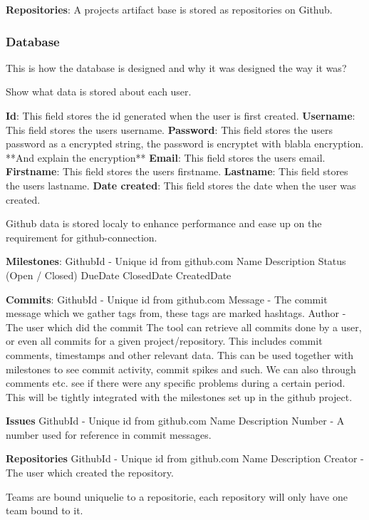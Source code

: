 \textbf{Repositories}:
A projects artifact base is stored as repositories on Github.

\subsubsection{Database}

This is how the database is designed and why it was designed the way it was?

Show what data is stored about each user.

\textbf{Id}: This field stores the id generated when the user is first created.
\textbf{Username}: This field stores the users username.
\textbf{Password}: This field stores the users password as a encrypted string, the password is encryptet with blabla encryption. **And explain the encryption**
\textbf{Email}: This field stores the users email.
\textbf{Firstname}: This field stores the users firstname.
\textbf{Lastname}: This field stores the users lastname.
\textbf{Date created}: This field stores the date when the user was created.

Github data is stored localy to enhance performance and ease up on the requirement for github-connection. 

\textbf{Milestones}:
GithubId - Unique id from github.com
Name
Description
Status (Open / Closed)
DueDate
ClosedDate
CreatedDate

\textbf{Commits}:
GithubId - Unique id from github.com
Message - The commit message which we gather tags from, these tags are marked hashtags.
Author - The user which did the commit
The tool can retrieve all commits done by a user, or even all commits for a given project/repository. This includes commit comments, timestamps and other relevant data. This can be used together with milestones to see commit activity, commit spikes and such. We can also through comments etc. see if there were any specific problems during a certain period. This will be tightly integrated with the milestones set up in the github project. 

\textbf{Issues}
GithubId - Unique id from github.com
Name
Description
Number - A number used for reference in commit messages.

\textbf{Repositories}
GithubId - Unique id from github.com
Name
Description
Creator - The user which created the repository.

Teams are bound uniquelie to a repositorie, each repository will only have one team bound to it. %

